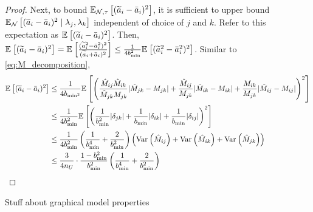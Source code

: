 \begin{proof}
Next, to bound $\mathbb{E}_{\mathcal{N}, \tau}\left[(\widetilde{a}_i - \bar{a}_i)^2\right]$, it is sufficient to upper bound $\mathbb{E}_{\mathcal{N}}\left[(\widetilde{a}_i - \bar{a}_i)^2 \; | \; \lambda_j, \lambda_k\right]$ independent of choice of $j$ and $k$. Refer to this expectation as $\mathbb{E}_{}\left[(\widetilde{a}_i - \bar{a}_i)^2\right]$. Then, $\mathbb{E}_{}\left[(\widetilde{a}_i - \bar{a}_i)^2 \right] = \mathbb{E}_{}\left[\frac{(\widetilde{a}_i^2 - \bar{a}_i^2)^2}{(\widetilde{a}_i + \bar{a}_i)^2}\right] \le \frac{1}{4b_{\min}^2} \mathbb{E}_{}\left[(\widetilde{a}_i^2 - \bar{a}_i^2)^2\right]$. Similar to \eqref{eq:M_decomposition},
\begin{align}
    \mathbb{E}_{}\left[(\widetilde{a}_i - \bar{a}_i)^2 \right] &\le \frac{1}{4b_{\min^2}} \mathbb{E}_{}\left[\left(\frac{\hat{M}_{ij} \hat{M}_{ik}}{\hat{M}_{jk} M_{jk}} |\hat{M}_{jk} - M_{jk}| + \frac{\hat{M}_{ij}}{M_{jk}}|\hat{M}_{ik} - M_{ik}| + \frac{M_{ik}}{M_{jk}} |\hat{M}_{ij} - M_{ij} |  \right)^2\right] \\
    &\le \frac{1}{4b_{\min}^2} \mathbb{E}_{}\left[\left(\frac{1}{b_{\min}^2} |\delta_{jk}| + \frac{1}{b_{\min}} |\delta_{ik} | + \frac{1}{b_{\min}}|\delta_{ij} | \right)^2\right] \\
    &\le \frac{1}{4b_{\min}^2} \left(\frac{1}{b_{\min}^4} + \frac{2}{b_{\min}^2}\right) \left(\mathrm{Var}_{}\left(\hat{M}_{ij}\right) + \mathrm{Var}_{}\left(\hat{M}_{ik}\right) + \mathrm{Var}_{}\left(\hat{M}_{jk}\right)\right) \\
    &\le \frac{3}{4 n_U} \cdot \frac{1 - b_{\min}^2}{b_{\min}^2} \left(\frac{1}{b_{\min}^4} + \frac{2}{b_{\min}^2} \right)
\end{align}


\end{proof}

Stuff about graphical model properties

